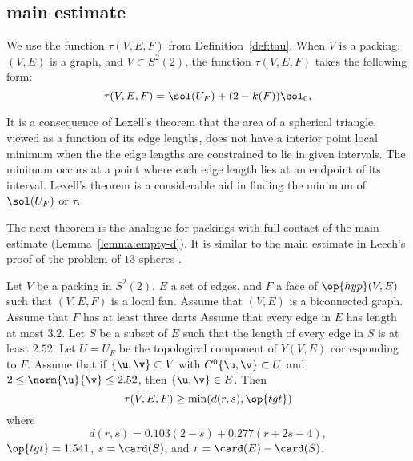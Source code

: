\subsection{main estimate}




We use the function $\tau(V,E,F)$ from Definition~\ref{def:tau}.  When
$V$ is a packing, $(V,E)$ is a  graph, and $V\subset
S^2(2)$, the function $\tau(V,E,F)$ takes the following form:
\[
\tau(V,E,F) = \sol(U_F) + (2-k(F)) \sol_0,
\]

\begin{remark}
  It is a consequence of Lexell's theorem that the area of a spherical
  triangle, viewed as a function of its edge lengths, does not have a
  interior point local minimum when the the edge lengths are
  constrained to lie in given intervals.  The minimum occurs at a
  point where each edge length lies at an endpoint of its interval.
  Lexell's theorem is a considerable aid in finding the minimum of
  $\sol(U_F)$ or $\tau$.
\end{remark}

The next theorem is the analogue for packings with full contact of the
main estimate (Lemma~\ref{lemma:empty-d}).  It is similar to the main
estimate in Leech's proof of the problem of $13$-spheres
\cite{Leech:1956:MG}.


\begin{theorem}\label{lemma:main-estimate-12}
  Let $V$ be a packing in $S^2(2)$, $E$ a set of edges, and $F$ a face
  of $\op{hyp}(V,E)$ such that $(V,E,F)$ is a local fan.  Assume that
  $(V,E)$ is a biconnected graph.  Assume that $F$ has at least three
  darts Assume that every edge in $E$ has length at most $3.2$.  Let
  $S$ be a subset of $E$ such that the length of every edge in $S$ is
  at least $2.52$.  Let $U=U_F$ be the topological component of
  $Y(V,E)$ corresponding to $F$.  Assume that if $\{\u,\v\}\subset V$
  with $C^0\{\u,\v\}\subset U$ and $2\le\norm{\u}{\v} \le 2.52$, then
  $\{\u,\v\}\in E$.  Then
\[\tau(V,E,F) \ge \min(d(r,s),\op{tgt})\]
where
\[
d(r,s) = 0.103 (2-s) + 0.277 (r+2s-4),
\]
$\op{tgt}=1.541$, 
$s = \card(S)$, and $r = \card(E)-\card(S)$.
\end{theorem}

